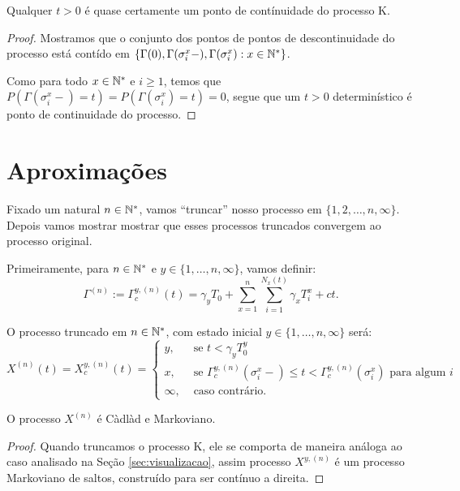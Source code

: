\begin{corolario}
  \label{cor:continuidades-processo}
  Qualquer $t > 0$ é quase certamente um ponto de contínuidade do
  processo K.
\end{corolario}
\begin{proof}
  Mostramos que o conjunto dos pontos de pontos de descontinuidade do
  processo está contído em $\{ \Gamma(0), \Gamma(\sigma_i^x-),
  \Gamma(\sigma_i^x): x \in {\mathbb{N^*}}\}$.

  Como para todo $x \in {\mathbb{N^*}}$ e $i \geq 1$, temos que
  $P(\Gamma(\sigma_i^x-) = t) = P(\Gamma(\sigma_i^x) = t) = 0$, segue
  que um $t > 0$ determinístico é ponto de continuidade do processo.
\end{proof}



\section{Aproximações}
\label{sec:aproximacoes}

Fixado um natural $n \in {\mathbb{N^*}}$, vamos ``truncar'' nosso processo em
$\{1, 2, \ldots, n, \infty\}$. Depois vamos mostrar mostrar que esses
processos truncados convergem ao processo original.

Primeiramente, para $n \in {\mathbb{N^*}}$ e $y \in \{1, \ldots, n, \infty\}$,
vamos definir:
\begin{equation}
  \Gamma^{(n)} := \Gamma^{y,(n)}_c (t) = \gamma_y T_0
  + \sum_{x =1}^{n} \sum_{i = 1}^{N_x(t)}
  \gamma_x T_i^x
  + ct.
\end{equation}

O processo truncado em $n \in {\mathbb{N^*}}$, com estado inicial $y \in \{1,
\ldots, n, \infty\}$ será:
\begin{equation}
  X^{(n)}(t) = X^{y,(n)}_c(t) = \begin{cases}
    y, & \textrm{ se }  t < \gamma_y T_0^y\\
    x, & \textrm{ se } \Gamma^{y,(n)}_c(\sigma_i^x-) \leq t <
    \Gamma^{y,(n)}_c(\sigma^x_i)
    \textrm{ para algum } i \\
    \infty, & \textrm{ caso contrário.}
  \end{cases}
\end{equation}

\begin{proposicao}
  O processo $X^{(n)}$ é Càdlàd e Markoviano.
\end{proposicao}
\begin{proof}
  Quando truncamos o processo K, ele se comporta de maneira análoga ao
  caso analisado na Seção \ref{sec:visualizacao}, assim processo
  $X^{y,(n)}$ é um processo Markoviano de saltos, construído para ser
  contínuo a direita.
\end{proof}

